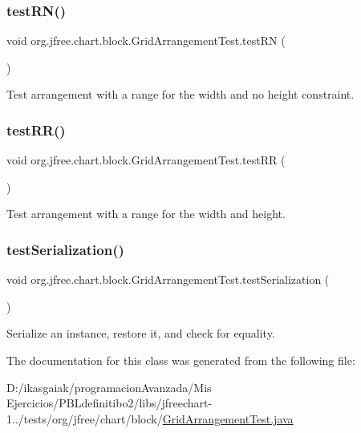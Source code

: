 \subsubsection{\texorpdfstring{test\+R\+N()}{testRN()}}
{\footnotesize\ttfamily void org.\+jfree.\+chart.\+block.\+Grid\+Arrangement\+Test.\+test\+RN (\begin{DoxyParamCaption}{ }\end{DoxyParamCaption})}

Test arrangement with a range for the width and no height constraint. \mbox{\label{classorg_1_1jfree_1_1chart_1_1block_1_1_grid_arrangement_test_a3394705bac0ba60a3adf6dffa7f1cec9}} 
\subsubsection{\texorpdfstring{test\+R\+R()}{testRR()}}
{\footnotesize\ttfamily void org.\+jfree.\+chart.\+block.\+Grid\+Arrangement\+Test.\+test\+RR (\begin{DoxyParamCaption}{ }\end{DoxyParamCaption})}

Test arrangement with a range for the width and height. \mbox{\label{classorg_1_1jfree_1_1chart_1_1block_1_1_grid_arrangement_test_af6ea97d769db6dc090b6e528a070ef27}} 
\subsubsection{\texorpdfstring{test\+Serialization()}{testSerialization()}}
{\footnotesize\ttfamily void org.\+jfree.\+chart.\+block.\+Grid\+Arrangement\+Test.\+test\+Serialization (\begin{DoxyParamCaption}{ }\end{DoxyParamCaption})}

Serialize an instance, restore it, and check for equality. 

The documentation for this class was generated from the following file\+:\begin{DoxyCompactItemize}
\item 
D\+:/ikasgaiak/programacion\+Avanzada/\+Mis Ejercicios/\+P\+B\+Ldefinitibo2/libs/jfreechart-\/1../tests/org/jfree/chart/block/\mbox{\hyperlink{_grid_arrangement_test_8java}{Grid\+Arrangement\+Test.\+java}}\end{DoxyCompactItemize}
